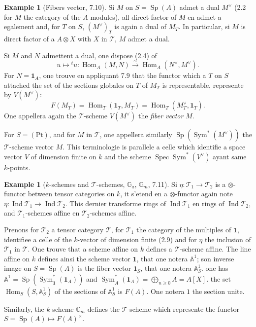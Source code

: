 \documentclass[12pt,a4paper]{article}
\theoremstyle{plain}
\theoremstyle{definition}
\newtheorem{example}[theorem]{Example}
\DeclareMathOperator{\Spec}{Spec}
\DeclareMathOperator{\Sp}{Sp}
\DeclareMathOperator{\Hom}{Hom}
\DeclareMathOperator{\Sym}{Sym}
\DeclareMathOperator{\Ind}{Ind}
\begin{document}
\begin{example}[Fibers vector, 7.10]
Si $M$ on $S = \Sp(A)$ admet a dual $M^\vee$ (2.2 for $M$ the category of the $A$-modules), all direct factor of $M$ en admet a egalement and, for $T$ on $S$, $(M^\vee)_T$ is again a dual of $M_T$. In particular, si $M$ is direct factor of a $A \otimes X$ with $X$ in $\mathcal{T}$, $M$ admet a dual.

Si $M$ and $N$ admettent a dual, one dispose (2.4) of
\[
u \mapsto {}^t u : \Hom_A(M, N) \xrightarrow{\sim} \Hom_A(N^\vee, M^\vee).
\]
For $N = \mathbf{1}_A$, one trouve en appliquant 7.9 that the functor which a $T$ on $S$ attached the set of the sections globales on $T$ of $M_T$ is representable, represente by $V(M^\vee)$:
\[
F(M_T) = \Hom_T(\mathbf{1}_T, M_T) = \Hom_T(M_T^\vee, \mathbf{1}_T).
\]
One appellera again the $\mathcal{T}$-scheme $V(M^\vee)$ the \emph{fiber vector} $M$.

For $S = (\mathrm{Pt})$, and for $M$ in $\mathcal{T}$, one appellera similarly $\Sp(\Sym^*(M^\vee))$ the $\mathcal{T}$-scheme vector $M$. This terminologie is parallele a celle which identifie a space vector $V$ of dimension finite on $k$ and the scheme $\Spec \Sym^*(V^\vee)$ ayant same $k$-points.
\end{example}

\begin{example}[$k$-schemes and $\mathcal{T}$-schemes, $\mathbb{G}_a$, $\mathbb{G}_m$, 7.11]
Si $\eta : \mathcal{T}_1 \to \mathcal{T}_2$ is a $\otimes$-functor between tensor categories on $k$, it s'etend en a $\otimes$-functor again note $\eta : \Ind\mathcal{T}_1 \to \Ind\mathcal{T}_2$. This dernier transforme rings of $\Ind\mathcal{T}_1$ en rings of $\Ind\mathcal{T}_2$, and $\mathcal{T}_1$-schemes affine en $\mathcal{T}_2$-schemes affine.

Prenons for $\mathcal{T}_2$ a tensor category $\mathcal{T}$, for $\mathcal{T}_1$ the category of the multiples of $\mathbf{1}$, identifiee a celle of the $k$-vector of dimension finite (2.9) and for $\eta$ the inclusion of $\mathcal{T}_1$ in $\mathcal{T}$. One trouve that a scheme affine on $k$ defines a $\mathcal{T}$-scheme affine. The line affine on $k$ defines ainsi the scheme vector $\mathbf{1}$, that one notera $\mathbb{A}^1$; son inverse image on $S = \Sp(A)$ is the fiber vector $\mathbf{1}_S$, that one notera $\mathbb{A}^1_S$. one has $\mathbb{A}^1 = \Sp(\Sym^*_\mathbf{1}(\mathbf{1}_A))$ and $\Sym^*_A(\mathbf{1}_A) = \bigoplus_{n \geq 0} A = A[X]$. the set $\Hom_S(S, \mathbb{A}^1_S)$ of the sections of $\mathbb{A}^1_S$ is $F(A)$. One notera $1$ the section unite.

Similarly, the $k$-scheme $\mathbb{G}_m$ defines the $\mathcal{T}$-scheme which represente the functor $S = \Sp(A) \mapsto F(A)^\times$.
\end{example}
\end{document}

